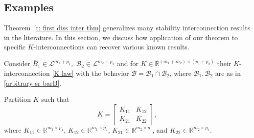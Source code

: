 \documentclass[letterpaper, 10 pt, conference]{ieeeconf}
\theoremstyle{ieeeconf}
\newcommand{\R}{\mathbb{R}}
\newcommand{\B}{\mathcal{B}}
\begin{document}
\subsection{Examples}
Theorem~\ref{t: first diss inter thm} generalizes many stability interconnection results in the literature. In this section, we discuss how application of our theorem to specific $K$-interconnections can recover various known results.

Consider $\bar{B}_1\in \mathcal{L}^{m_1+p_1}, \;\bar{\B}_2\in \mathcal{L}^{m_2+p_2}$ and for ${K\in \R^{(m_1+m_2)\times(p_1+p_2)}}$ their $K$-interconnection \eqref{K law} with the behavior ${\B=\B_1\cap \B_2}$, where $\B_1, \B_2$ are as in \eqref{arbitrary sr barB}. 

Partition $K$ such that
\begin{equation}
	K=\begin{bmatrix}
		K_{11} & K_{12}\\ K_{21} & K_{22}
	\end{bmatrix},
	\label{K partition}
\end{equation}
where $K_{11}\in \R^{m_1\times p_1}$,
$K_{12}\in \R^{m_1\times p_2}$, $K_{21}\in \R^{m_2\times p_1}$, and $K_{22}\in \R^{m_2\times p_2}$. 
\end{document}
